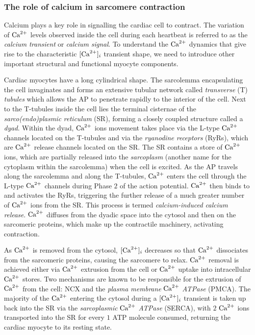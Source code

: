 %
%
%
\subsubsection{The role of calcium in sarcomere contraction}\label{ch1:the_role_of_calcium_in_sarcomere_contraction}
Calcium plays a key role in signalling the cardiac cell to contract. The variation of $\textrm{Ca}^{2+}$ levels observed inside the cell during each heartbeat is referred to as the \textit{calcium transient} or \textit{calcium signal}. To understand the $\textrm{Ca}^{2+}$ dynamics that give rise to the characteristic $[\textrm{Ca}^{2+}]_{i}$ transient shape, we need to introduce other important structural and functional myocyte components.

\vspace{0.2cm}
Cardiac myocytes have a long cylindrical shape. The sarcolemma encapsulating the cell invaginates and forms an extensive tubular network called \textit{transverse} (\acs{T}) \textit{tubules} which allows the AP to penetrate rapidly to the interior of the cell. Next to the T-tubules inside the cell lies the terminal cisternae of the \textit{sarco(endo)plasmic reticulum} (\acs{SR}), forming a closely coupled structure called a \textit{dyad}. Within the dyad, $\textrm{Ca}^{2+}$ ions movement takes place via the L-type $\textrm{Ca}^{2+}$ channels located on the T-tubules and via the \textit{ryanodine receptors} (\acs{RyR}s), which are $\textrm{Ca}^{2+}$ release channels located on the SR. The SR contains a store of $\textrm{Ca}^{2+}$ ions, which are partially released into the \textit{sarcoplasm} (another name for the cytoplasm within the sarcolemma) when the cell is excited. As the AP travels along the sarcolemma and along the T-tubules, $\textrm{Ca}^{2+}$ enters the cell through the L-type $\textrm{Ca}^{2+}$ channels during Phase $2$ of the action potential. $\textrm{Ca}^{2+}$ then binds to and activates the RyRs, triggering the further release of a much greater number of $\textrm{Ca}^{2+}$ ions from the SR. This process is termed \textit{calcium-induced calcium release}. $\textrm{Ca}^{2+}$ diffuses from the dyadic space into the cytosol and then on the sarcomeric proteins, which make up the contractile machinery, activating contraction.

\vspace{0.2cm}
As $\textrm{Ca}^{2+}$ is removed from the cytosol, $[\textrm{Ca}^{2+}]_{i}$ decreases so that $\textrm{Ca}^{2+}$ dissociates from the sarcomeric proteins, causing the sarcomere to relax. $\textrm{Ca}^{2+}$ removal is achieved either via $\textrm{Ca}^{2+}$ extrusion from the cell or $\textrm{Ca}^{2+}$ uptake into intracellular $\textrm{Ca}^{2+}$ stores. Two mechanisms are known to be responsible for the extrusion of $\textrm{Ca}^{2+}$ from the cell: NCX and the \textit{plasma membrane} $\textrm{Ca}^{2+}$ \textit{ATPase} (\acs{PMCA}). The majority of the $\textrm{Ca}^{2+}$ entering the cytosol during a $[\textrm{Ca}^{2+}]_{i}$ transient is taken up back into the SR via the \textit{sarcoplasmic} $\textrm{Ca}^{2+}$ \textit{ATPase} (\acs{SERCA}), with $2$ $\textrm{Ca}^{2+}$ ions transported into the SR for every $1$ ATP molecule consumed, returning the cardiac myocyte to its resting state.



